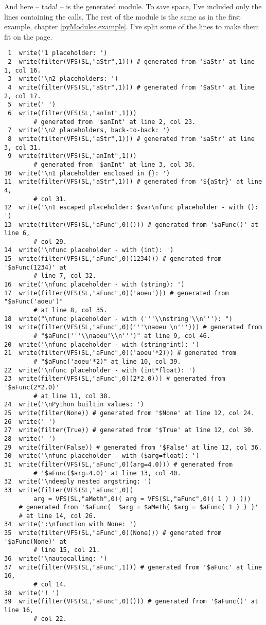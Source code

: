 And here -- tada! -- is the generated module.
To save space, I've included only the lines containing the  calls.
The rest of the module is the same as in the first example, chapter
\ref{pyModules.example}.  I've split some of the lines to make them fit on
the page.

\begin{verbatim}
 1  write('1 placeholder: ')
 2  write(filter(VFS(SL,"aStr",1))) # generated from '$aStr' at line 1, col 16.
 3  write('\n2 placeholders: ')
 4  write(filter(VFS(SL,"aStr",1))) # generated from '$aStr' at line 2, col 17.
 5  write(' ')
 6  write(filter(VFS(SL,"anInt",1))) 
        # generated from '$anInt' at line 2, col 23.
 7  write('\n2 placeholders, back-to-back: ')
 8  write(filter(VFS(SL,"aStr",1))) # generated from '$aStr' at line 3, col 31.
 9  write(filter(VFS(SL,"anInt",1))) 
        # generated from '$anInt' at line 3, col 36.
10  write('\n1 placeholder enclosed in {}: ')
11  write(filter(VFS(SL,"aStr",1))) # generated from '${aStr}' at line 4, 
        # col 31.
12  write('\n1 escaped placeholder: $var\nfunc placeholder - with (): ')
13  write(filter(VFS(SL,"aFunc",0)())) # generated from '$aFunc()' at line 6, 
        # col 29.
14  write('\nfunc placeholder - with (int): ')
15  write(filter(VFS(SL,"aFunc",0)(1234))) # generated from '$aFunc(1234)' at 
        # line 7, col 32.
16  write('\nfunc placeholder - with (string): ')
17  write(filter(VFS(SL,"aFunc",0)('aoeu'))) # generated from "$aFunc('aoeu')"
        # at line 8, col 35.
18  write("\nfunc placeholder - with ('''\\nstring'\\n'''): ")
19  write(filter(VFS(SL,"aFunc",0)('''\naoeu'\n'''))) # generated from 
        # "$aFunc('''\\naoeu'\\n''')" at line 9, col 46.
20  write('\nfunc placeholder - with (string*int): ')
21  write(filter(VFS(SL,"aFunc",0)('aoeu'*2))) # generated from 
        # "$aFunc('aoeu'*2)" at line 10, col 39.
22  write('\nfunc placeholder - with (int*float): ')
23  write(filter(VFS(SL,"aFunc",0)(2*2.0))) # generated from '$aFunc(2*2.0)' 
        # at line 11, col 38.
24  write('\nPython builtin values: ')
25  write(filter(None)) # generated from '$None' at line 12, col 24.
26  write(' ')
27  write(filter(True)) # generated from '$True' at line 12, col 30.
28  write(' ')
29  write(filter(False)) # generated from '$False' at line 12, col 36.
30  write('\nfunc placeholder - with ($arg=float): ')
31  write(filter(VFS(SL,"aFunc",0)(arg=4.0))) # generated from 
        # '$aFunc($arg=4.0)' at line 13, col 40.
32  write('\ndeeply nested argstring: ')
33  write(filter(VFS(SL,"aFunc",0)(  
        arg = VFS(SL,"aMeth",0)( arg = VFS(SL,"aFunc",0)( 1 ) ) ))) 
	# generated from '$aFunc(  $arg = $aMeth( $arg = $aFunc( 1 ) ) )' 
	# at line 14, col 26.
34  write(':\nfunction with None: ')
35  write(filter(VFS(SL,"aFunc",0)(None))) # generated from '$aFunc(None)' at 
        # line 15, col 21.
36  write('\nautocalling: ')
37  write(filter(VFS(SL,"aFunc",1))) # generated from '$aFunc' at line 16, 
        # col 14.
38  write('! ')
39  write(filter(VFS(SL,"aFunc",0)())) # generated from '$aFunc()' at line 16, 
        # col 22.
\end{verbatim}
